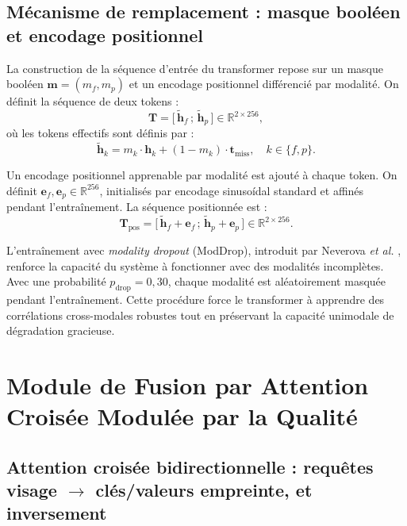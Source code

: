 \documentclass[12pt,a4paper]{report}
\begin{document}
\subsection{M\'{e}canisme de remplacement : masque bool\'{e}en et encodage positionnel}

La construction de la s\'{e}quence d'entr\'{e}e du transformer repose sur un masque bool\'{e}en $\mathbf{m} = (m_f, m_p)$ et un encodage positionnel diff\'{e}renci\'{e} par modalit\'{e}. On d\'{e}finit la s\'{e}quence de deux tokens :
\begin{equation}
\label{eq:sequence-tokens}
\mathbf{T} = \bigl[ \, \tilde{\mathbf{h}}_f \,; \, \tilde{\mathbf{h}}_p \, \bigr] \in \mathbb{R}^{2 \times 256},
\end{equation}
o\`{u} les tokens effectifs sont d\'{e}finis par :
\begin{equation}
\tilde{\mathbf{h}}_k = m_k \cdot \mathbf{h}_k + (1 - m_k) \cdot \mathbf{t}_{\text{miss}}, \quad k \in \{f, p\}.
\end{equation}

Un encodage positionnel apprenable par modalit\'{e} est ajout\'{e} \`{a} chaque token. On d\'{e}finit $\mathbf{e}_f, \mathbf{e}_p \in \mathbb{R}^{256}$, initialis\'{e}s par encodage sinuso\'{i}dal standard et affin\'{e}s pendant l'entra\^{i}nement. La s\'{e}quence positionn\'{e}e est :
\begin{equation}
\mathbf{T}_{\text{pos}} = \bigl[ \, \tilde{\mathbf{h}}_f + \mathbf{e}_f \,; \, \tilde{\mathbf{h}}_p + \mathbf{e}_p \, \bigr] \in \mathbb{R}^{2 \times 256}.
\end{equation}

L'entra\^{i}nement avec \emph{modality dropout} (ModDrop), introduit par Neverova \emph{et al.} \cite{neverova2016moddrop}, renforce la capacit\'{e} du syst\`{e}me \`{a} fonctionner avec des modalit\'{e}s incompl\`{e}tes. Avec une probabilit\'{e} $p_{\text{drop}} = 0{,}30$, chaque modalit\'{e} est al\'{e}atoirement masqu\'{e}e pendant l'entra\^{i}nement. Cette proc\'{e}dure force le transformer \`{a} apprendre des corr\'{e}lations cross-modales robustes tout en pr\'{e}servant la capacit\'{e} unimodale de d\'{e}gradation gracieuse.

\section{Module de Fusion par Attention Crois\'{e}e Modul\'{e}e par la Qualit\'{e}}
\label{sec:fusion-attention}

\subsection{Attention crois\'{e}e bidirectionnelle : requ\^{e}tes visage $\rightarrow$ cl\'{e}s/valeurs empreinte, et inversement}
\end{document}
